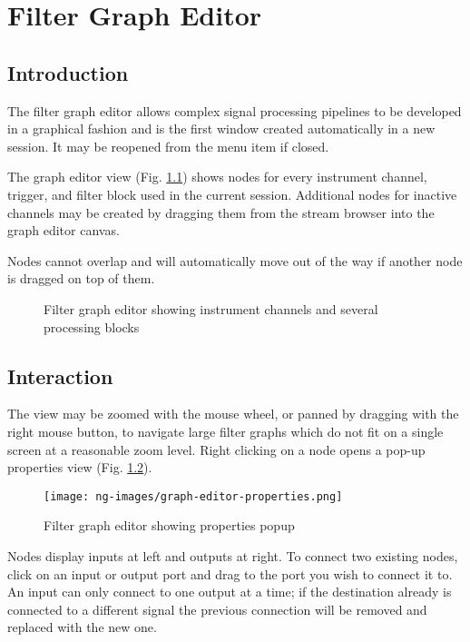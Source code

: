 \chapter{Filter Graph Editor}
\label{grapheditor}

\section{Introduction}

The filter graph editor allows complex signal processing pipelines to be developed in a graphical fashion and is the
first window created automatically in a new session. It may be reopened from the  menu
item if closed.

The graph editor view (Fig. \ref{graph-editor}) shows nodes for every instrument channel, trigger, and filter block
used in the current session. Additional nodes for inactive channels may be created by dragging them from the stream
browser into the graph editor canvas.

Nodes cannot overlap and will automatically move out of the way if
another node is dragged on top of them.

\begin{figure}[H]
\centering
{}
\caption{Filter graph editor showing instrument channels and several processing blocks}
\label{graph-editor}
\end{figure}

\section{Interaction}

The view may be zoomed with the mouse wheel, or panned by dragging with the right mouse button, to navigate large
filter graphs which do not fit on a single screen at a reasonable zoom level. Right clicking on a node opens a pop-up
properties view (Fig. \ref{graph-editor-properties}).

\begin{figure}[H]
\centering
\texttt{[image: ng-images/graph-editor-properties.png]}
\caption{Filter graph editor showing properties popup}
\label{graph-editor-properties}
\end{figure}

Nodes display inputs at left and outputs at right. To connect two existing nodes, click on an input or output port and
drag to the port you wish to connect it to. An input can only connect to one output at a time; if the destination
already is connected to a different signal the previous connection will be removed and replaced with the new one.

